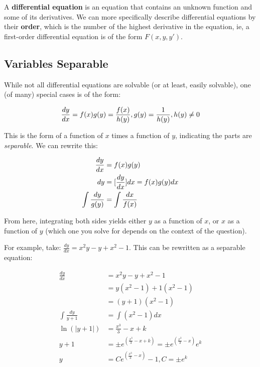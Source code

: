 \documentclass[12pt]{article}
\begin{document}
A \textbf{differential equation} is an equation that contains an unknown function and some of its derivatives. We can more specifically describe differential equations by their \textbf{order}, which is the number of the highest derivative in the equation, ie, a first-order differential equation is of the form $F(x,y,y')$.

\subsection{Variables Separable}\label{sec:separable}

While not all differential equations are solvable (or at least, easily solvable), one (of many) special cases is of the form:

\[
\frac{dy}{dx} = f(x)g(y) = \frac{f(x)}{h(y)}, g(y) = \frac{1}{h(y)}, h(y) \neq 0
\]

This is the form of a function of $x$ times a function of $y$, indicating the parts are \textit{separable}. We can rewrite this:

\begin{equation}
    \begin{split}
        \frac{dy}{dx} &= f(x)g(y)\\
        dy &= [\frac{dy}{dx}]dx = f(x)g(y)dx\\
        \int \frac{dy}{g(y)} &= \int \frac{dx}{f(x)}
    \end{split}
\end{equation}

From here, integrating both sides yields either $y$ as a function of $x$, or $x$ as a function of $y$ (which one you solve for depends on the context of the question).

For example, take: $\frac{dy}{dx} = x^2 y - y + x^2 -1$. This can be rewritten as a separable equation:

\begin{equation}
    \begin{split}
        \frac{dy}{dx} &= x^2y-y+x^2-1\\
        &= y(x^2-1)+1(x^2-1)\\
        &= (y+1)(x^2-1)\\
        \int \frac{dy}{y+1} &= \int (x^2-1)dx\\
        \ln(|y+1|) &= \frac{x^3}{3} - x + k\\
        y + 1 &= \pm e^{(\frac{x^3}{3}-x+k)} = \pm e^{(\frac{x^3}{3}-x)}e^k\\
        y &= Ce^{(\frac{x^3}{3}-x)}-1, C = \pm e^k
    \end{split}
\end{equation}
\end{document}
